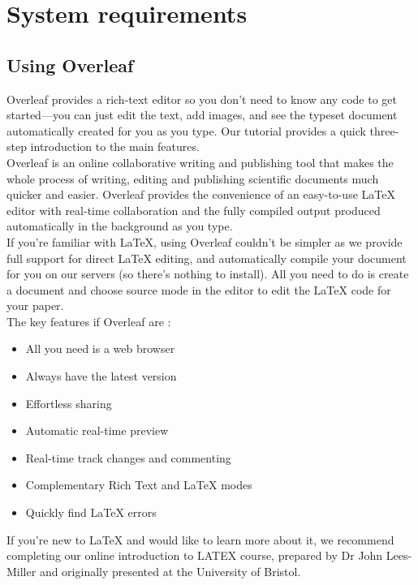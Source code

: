\chapter{System requirements}

\section{Using Overleaf}

Overleaf provides a rich-text editor so you don't need to know any code to get started—you can just edit the text, add images, and see the typeset document automatically created for you as you type. Our tutorial provides a quick three-step introduction to the main features. \\

Overleaf is an online collaborative writing and publishing tool that makes the whole process of writing, editing and publishing scientific documents much quicker and easier. Overleaf provides the convenience of an easy-to-use LaTeX editor with real-time collaboration and the fully compiled output produced automatically in the background as you type. \\

If you're familiar with LaTeX, using Overleaf couldn't be simpler as we provide full support for direct LaTeX editing, and automatically compile your document for you on our servers (so there's nothing to install). All you need to do is create a document and choose source mode in the editor to edit the LaTeX code for your paper. \\

\noindent The key features if Overleaf are :

\begin{itemize}
    \item All you need is a web browser
    \item Always have the latest version
    \item Effortless sharing
    \item Automatic real-time preview
    \item Real-time track changes and commenting
    \item Complementary Rich Text and LaTeX modes
    \item Quickly find LaTeX errors
\end{itemize}

If you're new to LaTeX and would like to learn more about it, we recommend completing our online introduction to LATEX course, prepared by Dr John Lees-Miller and originally presented at the University of Bristol. 

